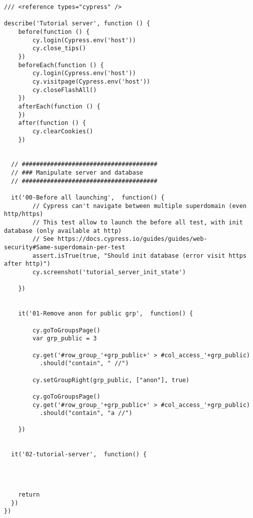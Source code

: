 
\begin{verbatim}
/// <reference types="cypress" />

describe('Tutorial server', function () {
    before(function () {
        cy.login(Cypress.env('host'))
        cy.close_tips()
    })
    beforeEach(function () {
        cy.login(Cypress.env('host'))
        cy.visitpage(Cypress.env('host'))
        cy.closeFlashAll()
    })
    afterEach(function () {
    })
    after(function () {
        cy.clearCookies()
    })


  // ######################################
  // ### Manipulate server and database
  // ######################################

  it('00-Before all launching',  function() {
        // Cypress can't navigate between multiple superdomain (even http/https)
        // This test allow to launch the before all test, with init database (only available at http)
        // See https://docs.cypress.io/guides/guides/web-security#Same-superdomain-per-test
        assert.isTrue(true, "Should init database (error visit https after http)")
        cy.screenshot('tutorial_server_init_state')

    })


    it('01-Remove anon for public grp',  function() {

        cy.goToGroupsPage()
        var grp_public = 3

        cy.get('#row_group_'+grp_public+' > #col_access_'+grp_public)
          .should("contain", " //")

        cy.setGroupRight(grp_public, ["anon"], true)

        cy.goToGroupsPage()
        cy.get('#row_group_'+grp_public+' > #col_access_'+grp_public)
          .should("contain", "a //")

    })


  it('02-tutorial-server',  function() {




\end{verbatim}



\begin{verbatim}
    return
  })
})

\end{verbatim}

